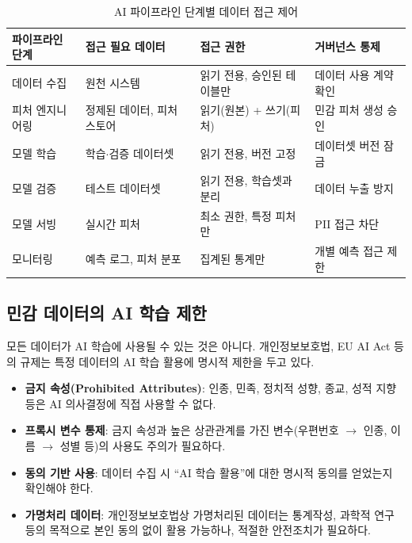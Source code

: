 \begin{table}[htbp]
\centering
\caption{AI 파이프라인 단계별 데이터 접근 제어}
\label{tab:pipeline_access_control}
\begin{tabularx}{\textwidth}{p{2.5cm}p{3cm}XX}
\toprule
\textbf{파이프라인 단계} & \textbf{접근 필요 데이터} & \textbf{접근 권한} & \textbf{거버넌스 통제} \\
\midrule
데이터 수집 & 원천 시스템 & 읽기 전용, 승인된 테이블만 & 데이터 사용 계약 확인 \\
\midrule
피처 엔지니어링 & 정제된 데이터, 피처 스토어 & 읽기(원본) + 쓰기(피처) & 민감 피처 생성 승인 \\
\midrule
모델 학습 & 학습$\cdot$검증 데이터셋 & 읽기 전용, 버전 고정 & 데이터셋 버전 잠금 \\
\midrule
모델 검증 & 테스트 데이터셋 & 읽기 전용, 학습셋과 분리 & 데이터 누출 방지 \\
\midrule
모델 서빙 & 실시간 피처 & 최소 권한, 특정 피처만 & PII 접근 차단 \\
\midrule
모니터링 & 예측 로그, 피처 분포 & 집계된 통계만 & 개별 예측 접근 제한 \\
\bottomrule
\end{tabularx}
\end{table}


\subsection{민감 데이터의 AI 학습 제한}
\label{sec:9.3.2}

모든 데이터가 AI 학습에 사용될 수 있는 것은 아니다. 개인정보보호법, EU AI Act 등의 규제는 특정 데이터의 AI 학습 활용에 명시적 제한을 두고 있다.

\begin{itemize}
 \item \textbf{금지 속성(Prohibited Attributes)}: 인종, 민족, 정치적 성향, 종교, 성적 지향 등은 AI 의사결정에 직접 사용할 수 없다.
 \item \textbf{프록시 변수 통제}: 금지 속성과 높은 상관관계를 가진 변수(우편번호 $\rightarrow$ 인종, 이름 $\rightarrow$ 성별 등)의 사용도 주의가 필요하다.
 \item \textbf{동의 기반 사용}: 데이터 수집 시 ``AI 학습 활용''에 대한 명시적 동의를 얻었는지 확인해야 한다.
 \item \textbf{가명처리 데이터}: 개인정보보호법상 가명처리된 데이터는 통계작성, 과학적 연구 등의 목적으로 본인 동의 없이 활용 가능하나, 적절한 안전조치가 필요하다.
\end{itemize}

